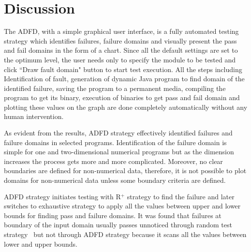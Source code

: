 



\section{Discussion} \label{sec:discussion4}

The ADFD, with a simple graphical user interface, is a fully automated testing strategy which identifies failures, failure domains and visually present the pass and fail domains in the form of a chart. Since all the default settings are set to the optimum level, the user needs only to specify the module to be tested and click ``Draw fault domain" button to start test execution. All the steps including Identification of fault, generation of dynamic Java program to find domain of the identified failure, saving the program to a permanent media, compiling the program to get its binary, execution of binaries to get pass and fail domain and plotting these values on the graph are done completely automatically without any human intervention.

As evident from the results, ADFD strategy effectively identified failures and failure domains in selected programs. Identification of the failure domain is simple for one and two-dimensional numerical programs but as the dimension increases the process gets more and more complicated. Moreover, no clear boundaries are defined for non-numerical data, therefore, it is not possible to plot domains for non-numerical data unless some boundary criteria are defined.

ADFD strategy initiates testing with R$^+$ strategy to find the failure and later switches to exhaustive strategy to apply all the values between upper and lower bounds for finding pass and failure domains. It was found that failures at boundary of the input domain usually passes unnoticed through random test strategy~\cite{reid1997empirical} but not through ADFD strategy because it scans all the values between lower and upper bounds.


